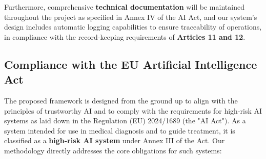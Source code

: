 \documentclass[11pt, a4paper]{article}
\begin{document}
Furthermore, comprehensive \textbf{technical documentation} will be maintained throughout the project as specified in Annex IV of the AI Act, and our system's design includes automatic logging capabilities to ensure traceability of operations, in compliance with the record-keeping requirements of \textbf{Articles 11 and 12}.
\subsection{Compliance with the EU Artificial Intelligence Act}
The proposed framework is designed from the ground up to align with the principles of trustworthy AI and to comply with the requirements for high-risk AI systems as laid down in the Regulation (EU) 2024/1689 (the "AI Act"). As a system intended for use in medical diagnosis and to guide treatment, it is classified as a \textbf{high-risk AI system} under Annex III of the Act. Our methodology directly addresses the core obligations for such systems:
\end{document}
